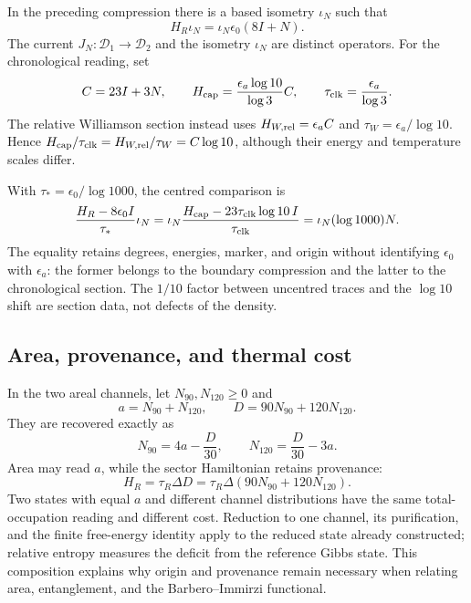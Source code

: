 In the preceding compression there is a based isometry $\iota_N$ such that
\[
 H_R\iota_N=\iota_N\epsilon_0(8I+N).
\]
The current $J_N:\mathcal D_1\to\mathcal D_2$ and the isometry
$\iota_N$ are distinct operators. For the chronological reading, set
\begin{equation}
 C=23I+3N,\qquad
 H_{\rm cap}=\frac{\epsilon_a\log10}{\log3}C,
 \qquad \tau_{\rm clk}=\frac{\epsilon_a}{\log3}.
 \label{v:eq:lector-capacidad-escalas}
\end{equation}
The relative Williamson section instead uses
$H_{W,{\rm rel}}=\epsilon_a C$ and
$\tau_W=\epsilon_a/\log10$. Hence
$H_{\rm cap}/\tau_{\rm clk}=H_{W,{\rm rel}}/\tau_W=C\log10$,
although their energy and temperature scales differ.

With $\tau_*=\epsilon_0/\log1000$, the centred comparison is
\begin{equation}
 \frac{H_R-8\epsilon_0I}{\tau_*}\iota_N
 =\iota_N\frac{H_{\rm cap}-23\tau_{\rm clk}\log10\,I}
                    {\tau_{\rm clk}}
 =\iota_N(\log1000)N.
 \label{v:eq:transporte-termico-centrado}
\end{equation}
The equality retains degrees, energies, marker, and origin without
identifying $\epsilon_0$ with $\epsilon_a$: the former belongs to the
boundary compression and the latter to the chronological section. The
$1/10$ factor between uncentred traces and the $\log10$ shift are section
data, not defects of the density.

\subsection{Area, provenance, and thermal cost}

In the two areal channels, let $N_{90},N_{120}\ge0$ and
\begin{equation}
 a=N_{90}+N_{120},\qquad D=90N_{90}+120N_{120}.
 \label{v:eq:ocupacion-procedencia-90-120}
\end{equation}
They are recovered exactly as
\begin{equation}
 N_{90}=4a-\frac D{30},\qquad
 N_{120}=\frac D{30}-3a.
 \label{v:eq:inversion-procedencia-90-120}
\end{equation}
Area may read $a$, while the sector Hamiltonian retains provenance:
\begin{equation}
 H_R=\tau_R\Delta D
 =\tau_R\Delta(90N_{90}+120N_{120}).
 \label{v:eq:hamiltoniano-area-procedencia}
\end{equation}
Two states with equal $a$ and different channel distributions have the same
total-occupation reading and different cost. Reduction to one channel, its
purification, and the finite free-energy identity apply to the reduced state
already constructed; relative entropy measures the deficit from the reference
Gibbs state. This composition explains why origin and provenance remain
necessary when relating area, entanglement, and the Barbero--Immirzi
functional.

